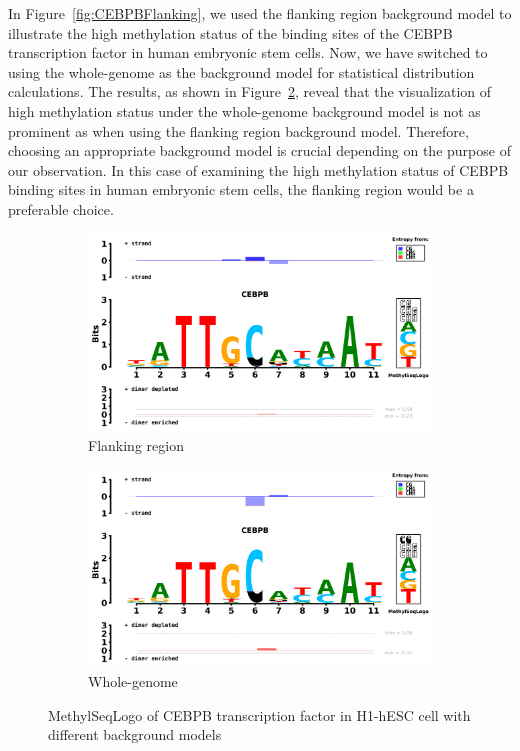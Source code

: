 \documentclass{PHlab-thesis}
\begin{document}
In Figure~\ref{fig:CEBPBFlanking}, we used the flanking region background model to illustrate the high methylation status of the binding sites of the CEBPB transcription factor in human embryonic stem cells. Now, we have switched to using the whole-genome as the background model for statistical distribution calculations. The results, as shown in Figure~\ref{fig:CEBPBWhole-genome}, reveal that the visualization of high methylation status under the whole-genome background model is not as prominent as when using the flanking region background model. Therefore, choosing an appropriate background model is crucial depending on the purpose of our observation. In this case of examining the high methylation status of CEBPB binding sites in human embryonic stem cells, the flanking region would be a preferable choice.
\begin{figure}[H]
	\centering
	\begin{subfigure}[b]{0.46\textwidth}
		\includegraphics[width=\textwidth]{figures/yulingCEBPB_human_H1-hESC_1000_Methyl_Kullback-Liebler_seqlogo.png}
		\caption{Flanking region}
		\label{fig:CEBPBFlanking region} 
	\end{subfigure}
	\begin{subfigure}[b]{0.48\textwidth}
		\includegraphics[width=\textwidth]{figures/CEBPBWG.png}
		\caption{Whole-genome}
		\label{fig:CEBPBWhole-genome} 
	\end{subfigure}
	\caption{MethylSeqLogo of CEBPB transcription factor in H1-hESC cell with different background models}
	\label{fig:CEBPBregion} 
\end{figure}
\end{document}
